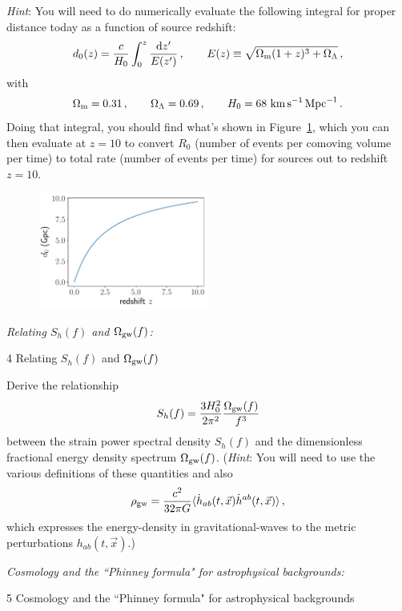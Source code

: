\documentclass[11pt]{article}
\def\be{\begin{equation}}
\def\ee{\end{equation}}
\def\i{\item{}}
\def\D{{\rm d}}
\begin{document}
{\em Hint}: You will need to do numerically evaluate the
following integral for proper distance today as a function 
of source redshift:
%
\be
d_0(z) = \frac{c}{H_0}\int_0^z\frac{\D z'}{E(z')}\,,
\qquad
E(z)\equiv \sqrt{\Omega_{\rm m}(1+z)^3 + \Omega_\Lambda}\,,
\ee
%
with 
%
\be
\Omega_{\rm m}=0.31\,,
\qquad
\Omega_\Lambda=0.69\,,
\qquad
H_0 = 68~{\rm km}\,{\rm s}^{-1}\, {\rm Mpc}^{-1}\,.
\ee
Doing that integral, you should find what's shown in
Figure~\ref{f:d0vsz}, which you can then evaluate at
$z=10$ to convert $R_0$ (number of events per 
comoving volume per time) to total rate (number of 
events per time) for sources out to redshift $z=10$.
%
\begin{figure}[htbp!]
\begin{center}
\includegraphics[width=0.5\textwidth]{d0vsz}
\caption{}
\label{f:d0vsz}
\end{center}
\end{figure}
%

\i {\em Relating $S_h(f)$ and $\Omega_{\rm gw}(f)$:}
{4 Relating $S_h(f)$ and $\Omega_{\rm gw}(f)$}

Derive the relationship 
\be
S_h(f) = \frac{3 H_0^2}{2\pi^2}\frac{\Omega_{\rm gw}(f)}{f^3}
\ee
between the strain power spectral density $S_h(f)$ and the 
dimensionless fractional energy density spectrum $\Omega_{\rm gw}(f)$.
({\em Hint}: You will need to use the various definitions of these
quantities and also 
\be
\rho_{\rm gw} =\frac{c^2}{32\pi G}\langle \dot h_{ab}(t,\vec x)\dot h^{ab}(t,\vec x)\rangle\,,
\ee
which expresses the energy-density in gravitational-waves to 
the metric perturbations $h_{ab}(t,\vec x)$.)

\i {\em Cosmology and the ``Phinney formula" for astrophysical backgrounds:}
{5 Cosmology and the ``Phinney formula" for astrophysical backgrounds}
\end{document}
